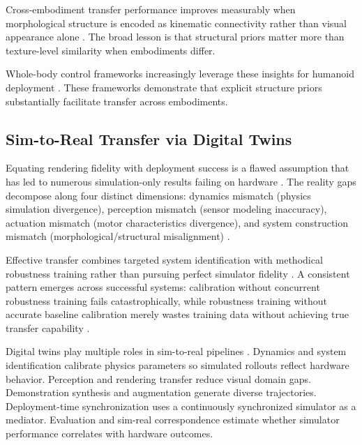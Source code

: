 \documentclass[12pt,a4paper,oneside]{report}
\begin{document}
Cross-embodiment transfer performance improves measurably when morphological structure is encoded as kinematic connectivity rather than visual appearance alone \cite{wu2025dexgrasp, patel2024getzero}. The broad lesson is that structural priors matter more than texture-level similarity when embodiments differ.

Whole-body control frameworks increasingly leverage these insights for humanoid deployment \cite{zhao2026agile, liang2025wholebody, ren2026cybowaiter, peng2026eagle, li2026haic}. These frameworks demonstrate that explicit structure priors substantially facilitate transfer across embodiments.

\subsection{Sim-to-Real Transfer via Digital Twins}

Equating rendering fidelity with deployment success is a flawed assumption that has led to numerous simulation-only results failing on hardware \cite{aljalbout2026realitygap}. The reality gaps decompose along four distinct dimensions: dynamics mismatch (physics simulation divergence), perception mismatch (sensor modeling inaccuracy), actuation mismatch (motor characteristics divergence), and system construction mismatch (morphological/structural misalignment) \cite{tan2018simtoreal, aljalbout2026realitygap}.

Effective transfer combines targeted system identification with methodical robustness training rather than pursuing perfect simulator fidelity \cite{tan2018simtoreal, liu2024cyclerl}. A consistent pattern emerges across successful systems: calibration without concurrent robustness training fails catastrophically, while robustness training without accurate baseline calibration merely wastes training data without achieving true transfer capability \cite{tan2018simtoreal, aljalbout2026realitygap}.

Digital twins play multiple roles in sim-to-real pipelines \cite{tan2018simtoreal, heiden2022inferring, lou2026drex, qureshi2025splatsim, tang2025semantic, yang2025robosplat, yu2025real2render2real, abou2024realissim, jain2025polaris, li2024simpler, zhang2025unipr, cai2025gausstwin, jiang2024digitaltwin, murugesan2024digitaltwin, mari2024digitaltwin}. Dynamics and system identification calibrate physics parameters so simulated rollouts reflect hardware behavior. Perception and rendering transfer reduce visual domain gaps. Demonstration synthesis and augmentation generate diverse trajectories. Deployment-time synchronization uses a continuously synchronized simulator as a mediator. Evaluation and sim-real correspondence estimate whether simulator performance correlates with hardware outcomes.
\end{document}

